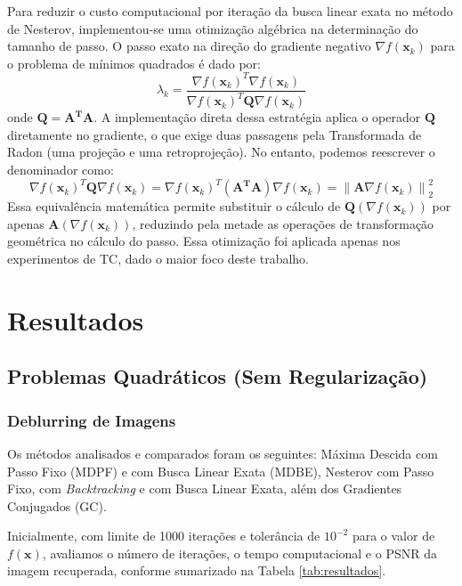 \documentclass[12pt]{article}
\newcommand{\norm}[1]{\left\lVert#1\right\rVert}
\begin{document}
Para reduzir o custo computacional por iteração da busca linear exata no método de Nesterov, implementou-se uma otimização algébrica na determinação do tamanho de passo. O passo exato na direção do gradiente negativo $\nabla f(\mathbf{x}_k)$ para o problema de mínimos quadrados é dado por: 
\[ 
\lambda_k = \frac{\nabla f(\mathbf{x}_k)^T \nabla f(\mathbf{x}_k)}{\nabla f(\mathbf{x}_k)^T \mathbf{Q} \nabla f(\mathbf{x}_k)} 
\] 
onde $\mathbf{Q} = \mathbf{A^TA}$. A implementação direta dessa estratégia aplica o operador $\mathbf{Q}$ diretamente no gradiente, o que exige duas passagens pela Transformada de Radon (uma projeção e uma retroprojeção). No entanto, podemos reescrever o denominador como: 
\[ 
\nabla f(\mathbf{x}_k)^T \mathbf{Q} \nabla f(\mathbf{x}_k) = \nabla f(\mathbf{x}_k)^T (\mathbf{A^T A}) \nabla f(\mathbf{x}_k) = \norm{\mathbf{A} \nabla f(\mathbf{x}_k)}_2^2 
\] 
Essa equivalência matemática permite substituir o cálculo de $\mathbf{Q}(\nabla f(\mathbf{x}_k))$ por apenas $\mathbf{A}(\nabla f(\mathbf{x}_k))$, reduzindo pela metade as operações de transformação geométrica no cálculo do passo. Essa otimização foi aplicada apenas nos experimentos de TC, dado o maior foco deste trabalho.


\section{Resultados}

\subsection{Problemas Quadráticos (Sem Regularização)}

\subsubsection{Deblurring de Imagens}

Os métodos analisados e comparados foram os seguintes: Máxima Descida com Passo Fixo (MDPF) e com Busca Linear Exata (MDBE), Nesterov com Passo Fixo, com \textit{Backtracking} e com Busca Linear Exata, além dos Gradientes Conjugados (GC).

Inicialmente, com limite de 1000 iterações e tolerância de $10^{-2}$ para o valor de $f(\mathbf{x})$, avaliamos o número de iterações, o tempo computacional e o PSNR da imagem recuperada, conforme sumarizado na Tabela \ref{tab:resultados}.
\end{document}
